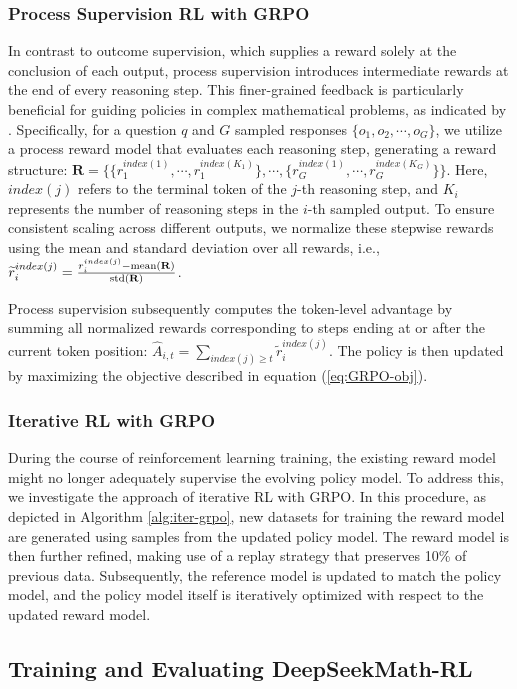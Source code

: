 \begin{itemize}[topsep=0pt]
\subsubsection{Process Supervision RL with GRPO} In contrast to outcome supervision, which supplies a reward solely at the conclusion of each output, process supervision introduces intermediate rewards at the end of every reasoning step. This finer-grained feedback is particularly beneficial for guiding policies in complex mathematical problems, as indicated by \cite{wang2023math}. Specifically, for a question $q$ and $G$ sampled responses $\{o_1, o_2, \cdots, o_G\}$, we utilize a process reward model that evaluates each reasoning step, generating a reward structure: $\mathbf{R} = \{ \{r_1^{index(1)},\cdots,r_1^{index(K_1)}\}, \cdots,  \{r_G^{index(1)},\cdots,r_G^{index(K_G)}\} \}$. Here, $index(j)$ refers to the terminal token of the $j$-th reasoning step, and $K_i$ represents the number of reasoning steps in the $i$-th sampled output. To ensure consistent scaling across different outputs, we normalize these stepwise rewards using the mean and standard deviation over all rewards, i.e., $\widetilde{r}_i^{index(j)} = \frac{r_i^{index(j)} - {\rm mean(\mathbf{R})}}{{\rm std(\mathbf{R})}}$.

Process supervision subsequently computes the token-level advantage by summing all normalized rewards corresponding to steps ending at or after the current token position: $\hat{A}_{i, t} = \sum_{index(j) \ge t} \widetilde{r}_i^{index(j)}$. The policy is then updated by maximizing the objective described in equation (\ref{eq:GRPO-obj}).

\subsubsection{Iterative RL with GRPO} During the course of reinforcement learning training, the existing reward model might no longer adequately supervise the evolving policy model. To address this, we investigate the approach of iterative RL with GRPO. In this procedure, as depicted in Algorithm \ref{alg:iter-grpo}, new datasets for training the reward model are generated using samples from the updated policy model. The reward model is then further refined, making use of a replay strategy that preserves 10\% of previous data. Subsequently, the reference model is updated to match the policy model, and the policy model itself is iteratively optimized with respect to the updated reward model.

\subsection{Training and Evaluating DeepSeekMath-RL}


\end{itemize}
